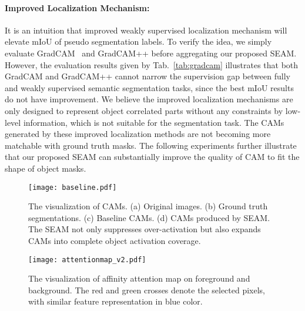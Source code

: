 \documentclass[10pt,twocolumn,letterpaper]{article}
\begin{document}
\paragraph{Improved Localization Mechanism:}
	
	It is an intuition that improved weakly supervised localization mechanism will elevate mIoU of pseudo segmentation labels. To verify the idea, we simply evaluate GradCAM~\cite{GradCAM} and GradCAM++\cite{GradCAM++} before aggregating our proposed SEAM. However, the evaluation results given by Tab.~\ref{tab:gradcam} illustrates that both GradCAM and GradCAM++ cannot narrow the supervision gap between fully and weakly supervised semantic segmentation tasks, since the best mIoU results do not have improvement. We believe the improved localization mechanisms are only designed to represent object correlated parts without any constraints by low-level information, which is not suitable for the segmentation task. The CAMs generated by these improved localization methods are not becoming more matchable with ground truth masks. The following experiments further illustrate that our proposed SEAM can substantially improve the quality of CAM to fit the shape of object masks. 
	\begin{figure}[tbp]
		\centering
		\texttt{[image: baseline.pdf]}
		\caption{The visualization of CAMs. (a) Original images. (b) Ground truth segmentations. (c) Baseline CAMs. (d) CAMs produced by SEAM. The SEAM not only suppresses over-activation but also expands CAMs into complete object activation coverage.}
		\label{fig:baseline}
\end{figure}
	\begin{figure}[tbp]
		\centering
		\texttt{[image: attentionmap\_v2.pdf]}
		\caption{The visualization of affinity attention map on foreground and background. The red and green crosses denote the selected pixels, with similar feature representation in blue color.}
		\label{fig:attmap}
\end{figure}
\end{document}
